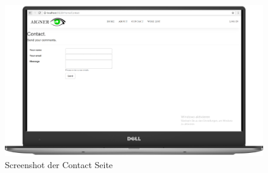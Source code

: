 \begin{figure}[H]
\begin{center}
	\includegraphics[scale=.2]{images/Contact.png}
\end{center}
	\caption{Screenshot der Contact Seite}
	\label{fig:sample}
\end{figure}


